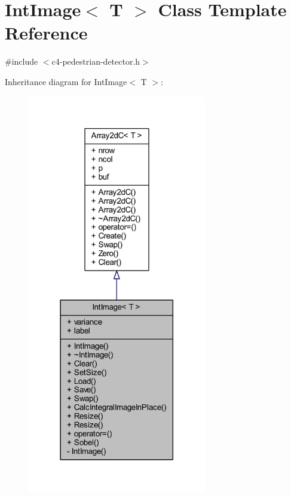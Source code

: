 \hypertarget{class_int_image}{}\section{Int\+Image$<$ T $>$ Class Template Reference}
\label{class_int_image}


{\ttfamily \#include $<$c4-\/pedestrian-\/detector.\+h$>$}



Inheritance diagram for Int\+Image$<$ T $>$\+:\nopagebreak
\begin{figure}[H]
\begin{center}
\leavevmode
\includegraphics[width=221pt]{class_int_image__inherit__graph}
\end{center}
\end{figure}



